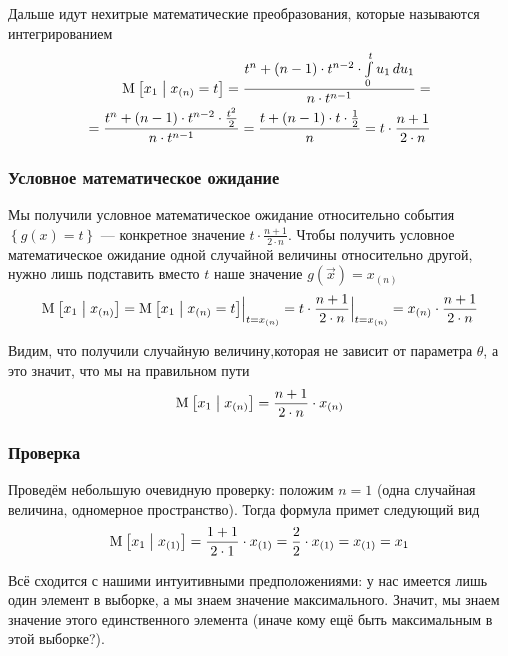 Дальше идут нехитрые математические преобразования,
которые называются интегрированием
\begin{align*}
    \mathrm{M}_{} \left[ x_1 \;\middle|\; x_{\left( n \right)} = t \right]
    = \frac{t^n + \left( n-1 \right) \cdot t^{n-2} 
        \cdot \int\limits_{0}^{t} u_1 \, d u_1}{n \cdot t^{n-1}} = \\
    = \frac{t^n + \left( n-1 \right) \cdot t^{n-2}
        \cdot \frac{t^2}{2}}{n \cdot t^{n-1}}
    = \frac{t + \left( n-1 \right) \cdot t \cdot \frac{1}{2}}{n}
    = t \cdot \frac{n+1}{2 \cdot n}
\end{align*}

\subsubsection{Условное математическое ожидание}
Мы получили условное математическое ожидание относительно события
$\left\{ g\left( x \right) = t \right\}$ --- конкретное значение
$t \cdot \frac{n+1}{2 \cdot n}$.
Чтобы получить условное математическое ожидание одной случайной величины
относительно другой, нужно лишь подставить вместо $t$
наше значение $g\left( \vec{x} \right) = x_{\left( n \right)}$
$$\mathrm{M}_{} \left[ x_1 \;\middle|\; x_{\left( n \right)} \right]
    = \Bigl. \mathrm{M}_{} \left[ x_1 \;\middle|\; x_{\left( n \right)} = t \right]
        \Bigr|_{t = x_{\left( n \right)}}
    = \Bigl. t \cdot \frac{n+1}{2 \cdot n} \Bigr|_{t = x_{\left( n \right)}}
    = x_{\left( n \right)} \cdot \frac{n+1}{2 \cdot n}$$

Видим, что получили случайную величину,которая не зависит от параметра
$\theta$, а это значит, что мы на правильном пути
$$\mathrm{M}_{} \left[ x_1 \;\middle|\; x_{\left( n \right)} \right]
    = \frac{n+1}{2 \cdot n} \cdot x_{\left( n \right)}$$

\subsubsection{Проверка}
Проведём небольшую очевидную проверку: положим $n=1$ (одна случайная величина,
одномерное пространство). Тогда формула примет следующий вид
$$\mathrm{M}_{} \left[ x_1 \;\middle|\; x_{\left( 1 \right)} \right]
    = \frac{1+1}{2 \cdot 1} \cdot x_{\left( 1 \right)}
    = \frac{2}{2} \cdot x_{\left( 1 \right)}
    = x_{\left( 1 \right)} = x_1$$

Всё сходится с нашими интуитивными предположениями: у нас имеется лишь один
элемент в выборке, а мы знаем значение максимального. Значит, мы знаем
значение этого единственного элемента (иначе кому ещё быть максимальным
в этой выборке?).
